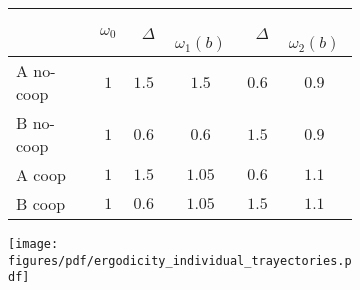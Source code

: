 \documentclass[a4paper,10pt]{article}
\newif\ifen
\newif\ifes
\newcommand{\en}[1]{\ifen#1 \fi}
\newcommand{\es}[1]{\ifes#1 \fi}
\begin{document}
\begin{figure}[ht!]
\vspace{-0.1cm}
\centering
 \begin{subfigure}[c]{0.50\textwidth}
 \centering
  \begin{tabular}{|l|c|c|c|c|c|}
     \hline
         & {\small $\omega_0$} & {\small \  $\Delta$}  & {\small \, $\omega_1(b)$ } & {\small \  $\Delta$}  & {\small \,  $\omega_2(b)$ }  \\ \hline \hline
        A no-coop& $1$ & $1.5$ &  $1.5$ & $0.6$ & $\bm{0.9}$ \\ \hline
        B no-coop & $1$ & $0.6$ & $0.6$ & $1.5$ & $\bm{0.9}$ \\ \hline\hline
        A coop & $1$ & $1.5$ & $1.05$ & $0.6$ & $\bm{1.1}$ \\ \hline
        B coop & $1$ & $0.6$ & $1.05$ & $1.5$ & $\bm{1.1}$\\ \hline
\end{tabular}
 \end{subfigure}
 \begin{subfigure}[c]{0.45\textwidth}
\begin{flushright}
 \texttt{[image: figures/pdf/ergodicity\_individual\_trayectories.pdf]}
 \end{flushright}
 \end{subfigure}
 \caption{
 \en{Reducing fluctuations through cooperation allows individuals to reach growth rates they would never achieve alone.}%
 \es{Reducir fluctuaciones por cooperación le permite a los individuos alcanzar tasas de crecimiento que jamás obtendrían solos.}%
 \en{In the table (left) $\Delta$ represents the change in resources experienced by individuals at random, with $b=p=0.5$.}%
 \es{En la tabla (izquierda) $\Delta$ representa el cambio en los recursos que sufren los individuos de forma aleatoria, con $b=p=0.5$.}%
 \en{In the figure (right), the colored curves are the trajectories of the resources playing individually, and the black line is the trajectory of the resources playing in cooperative groups.}%
 \es{En la figura (derecha), las curvas de colores son las trayectoria de los recursos jugando individualmente, y la recta negra es la trayectoria de los recursos jugando en grupos cooperativos.}%
 }
 \label{fig:coop}
 \vspace{-0.1cm}
 \end{figure}


\end{document}
